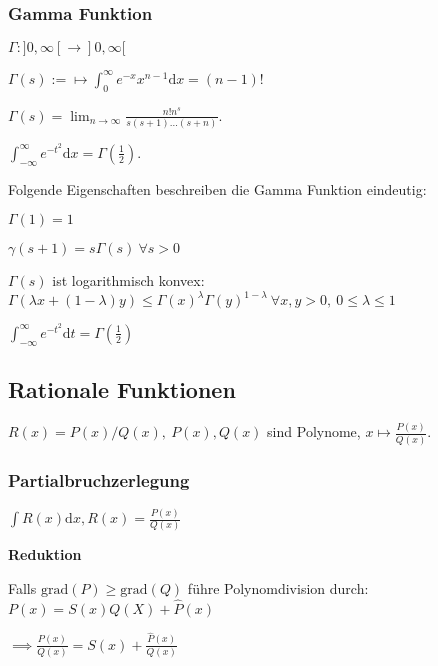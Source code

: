 \subsubsection{Gamma Funktion}
\begin{compactitem}
    \item $\Gamma: ]0, \infty[ \to ]0, \infty[$
    \item $\Gamma(s) := \mapsto \int_{0}^{\infty} e^{-x}x^{n-1} \mathrm{d}x = (n-1)!$
    \item $\Gamma(s) = \lim_{n \to \infty} \frac{n!n^s}{s(s+1)\dots (s+n)}$.
    \item $\int_{-\infty}^{\infty} e^{-t^2}\mathrm{d}x = \Gamma(\frac{1}{2})$.
\end{compactitem}

Folgende Eigenschaften beschreiben die Gamma Funktion eindeutig:
\begin{inparaenum}
    \item $\Gamma(1) = 1$
    \item $\gamma(s + 1) = s \Gamma(s) \ \forall s > 0$
    \item $\Gamma(s)$ ist logarithmisch konvex: $\Gamma(\lambda x + (1- \lambda)y) \le \Gamma(x)^\lambda \Gamma(y)^{1-\lambda} \ \forall x,y > 0, \ 0 \le \lambda \le 1$
\end{inparaenum}
\begin{compactitem}
    \item $\int_{-\infty}^{\infty} e^{-t^2}\mathrm{d}t = \Gamma(\frac{1}{2})$
\end{compactitem}

\subsection{Rationale Funktionen}
$R(x) = P(x) / Q(x), \ P(x), Q(x)$ sind Polynome, $x \mapsto \frac{P(x)}{Q(x)}$.
\begin{compactitem}
    \item
\end{compactitem}

\subsubsection{Partialbruchzerlegung}
$\int R(x) \mathrm{d}x, R(x) = \frac{P(x)}{Q(x)}$
\begin{compactenum}
    \item \textbf{Reduktion}
        \begin{compactitem}
            \item Falls $\text{grad}(P) \ge \text{grad}(Q)$ führe Polynomdivision durch: $P(x) = S(x)Q(X) + \hat{P}(x)$
            \item $\implies \frac{P(x)}{Q(x)} = S(x) + \frac{\hat{P}(x)}{Q(x)}$
        \end{compactitem}
    \item \textbf{}
\end{compactenum}

